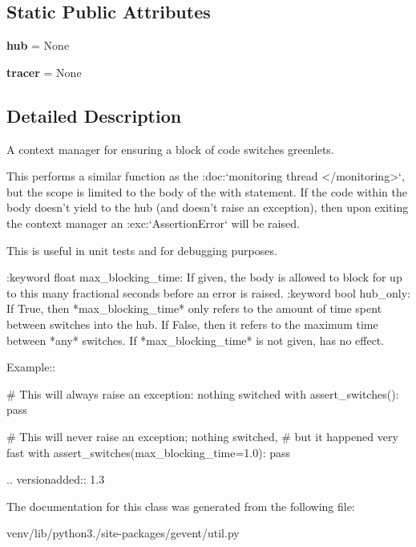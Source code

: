 \subsection*{Static Public Attributes}
\begin{DoxyCompactItemize}
\item 
\mbox{\label{classgevent_1_1util_1_1assert__switches_abd11019c381da44d6593624da17dd987}} 
{\bfseries hub} = None
\item 
\mbox{\label{classgevent_1_1util_1_1assert__switches_a4d41e3bea50d21da33bf18bc3b63e09c}} 
{\bfseries tracer} = None
\end{DoxyCompactItemize}


\subsection{Detailed Description}
\begin{DoxyVerb}A context manager for ensuring a block of code switches greenlets.

This performs a similar function as the :doc:`monitoring thread
</monitoring>`, but the scope is limited to the body of the with
statement. If the code within the body doesn't yield to the hub
(and doesn't raise an exception), then upon exiting the
context manager an :exc:`AssertionError` will be raised.

This is useful in unit tests and for debugging purposes.

:keyword float max_blocking_time: If given, the body is allowed
    to block for up to this many fractional seconds before
    an error is raised.
:keyword bool hub_only: If True, then *max_blocking_time* only
    refers to the amount of time spent between switches into the
    hub. If False, then it refers to the maximum time between
    *any* switches. If *max_blocking_time* is not given, has no
    effect.

Example::

    # This will always raise an exception: nothing switched
    with assert_switches():
        pass

    # This will never raise an exception; nothing switched,
    # but it happened very fast
    with assert_switches(max_blocking_time=1.0):
        pass

.. versionadded:: 1.3
\end{DoxyVerb}
 

The documentation for this class was generated from the following file\+:\begin{DoxyCompactItemize}
\item 
venv/lib/python3./site-\/packages/gevent/util.\+py\end{DoxyCompactItemize}
